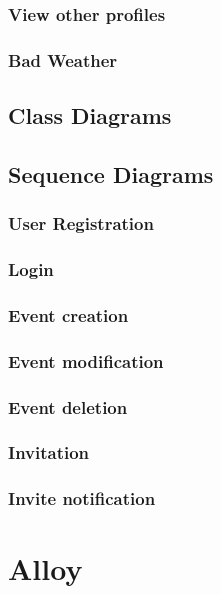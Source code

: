 \subsubsection{View other profiles}
\subsubsection{Bad Weather}
\subsection{Class Diagrams}
\subsection{Sequence Diagrams}
\subsubsection{User Registration}
\subsubsection{Login}
\subsubsection{Event creation}
\subsubsection{Event modification}
\subsubsection{Event deletion}
\subsubsection{Invitation}
\subsubsection{Invite notification}
\section{Alloy}